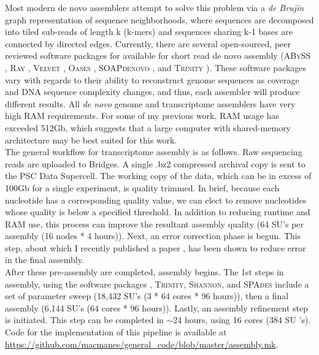 \documentclass[10.5pt]{article}
\begin{document}
{\noindent
Most modern de novo assemblers attempt to solve this problem via a \textit{de Brujin} graph representation of sequence neighborhoods, where sequences are decomposed into tiled sub-reads of length k (k-mers) and sequences sharing k-1 bases are connected by directed edges.  Currently, there are several open-sourced, peer reviewed software packages for available for short read de novo assembly (\textsc{ABySS} \citep{Birol:2009ia,Simpson:2009iv}, \textsc{Ray} \citep{Boisvert:2010dz}, \textsc{Velvet} \citep{Zerbino:2008bm}, \textsc{Oases} \citep{Schulz:2012je}, \textsc{SOAPdenovo} \citep{Li:2009cx},  and \textsc{Trinity} \citep{Haas:jq,Grabherr:2011jb}).  These software packages vary with regards to their ability to reconstruct genome sequences as coverage and DNA sequence complexity changes, and thus, each assembler will produce different results.  All \textit{de novo} genome and transcriptome assemblers have very high RAM requirements. For some of my previous work, RAM usage has exceeded 512Gb, which suggests that a large computer with shared-memory architecture may be best suited for this work.   \\

\noindent
The general workflow for transcriptome assembly is as follows. Raw sequencing reads are uploaded to Bridges.  A single .bz2 compressed archival copy is sent to the PSC Data Supercell. The working copy of the data, which can be in excess of 100Gb for a single experiment, is quality trimmed. In brief, because each nucleotide has a corresponding quality value, we can elect to remove nucleotides whose quality is below a specified threshold. In addition to reducing runtime and RAM use, this process can improve the resultant assembly quality (64 SU's per assembly (16 nodes * 4 hours)). Next, an error correction phase is begun.  This step, about which I recently published a paper \citep{MacManes:2013ec}, has been shown to reduce error in the final assembly.  \\

\noindent
After these pre-assembly are completed, assembly begins. The 1st steps in assembly, using the software packages , \textsc{Trinity}, \textsc{Shannon}, and \textsc{SPAdes} include a set of parameter sweep (18,432 SU's (3 * 64 cores * 96 hours)), then a final assembly (6,144 SU's (64 cores * 96 hours)). Lastly, an assembly refinement step is initiated. This step can be completed in $\sim$24 hours, using 16 cores (384 SU
's). Code for the implementation of this pipeline is available at \url{https://github.com/macmanes/general_code/blob/master/assembly.mk}.  \\

}
\end{document}
